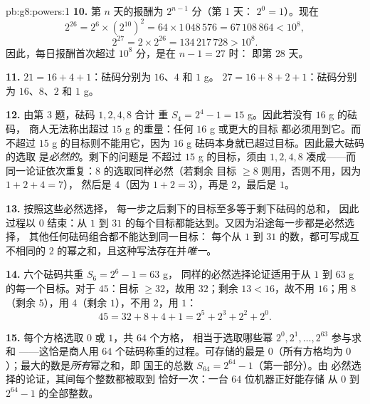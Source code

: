 \begin{solution}{pb:g8:powers:1}
\textbf{10.} 第 $n$ 天的报酬为 $2^{n-1}$ 分（第 1 天：
$2^0 = 1$）。现在
\[
2^{26} = 2^6 \times \left(2^{10}\right)^2
= 64 \times 1\,048\,576 = 67\,108\,864 < 10^8,
\]
\[
2^{27} = 2 \times 2^{26} = 134\,217\,728 > 10^8 .
\]
因此，每日报酬首次超过 $10^8$ 分，是在 $n - 1 = 27$ 时：
即第 $28$ 天。

\textbf{11.} $21 = 16 + 4 + 1$：砝码分别为 $16$、$4$ 和 $1$ g。
$27 = 16 + 8 + 2 + 1$：砝码分别为 $16$、$8$、$2$ 和 $1$ g。

\textbf{12.} 由第 3 题，砝码 $1, 2, 4, 8$ 合计
重 $S_4 = 2^4 - 1 = 15$ g。因此若没有 $16$ g 的砝码，
商人无法称出超过 $15$ g 的重量：任何 $16$ g 或更大的目标
都必须用到它。而不超过 $15$ g 的目标则不能用它，因为
$16$ g 砝码本身就已超过目标。因此最大砝码的选取
是\emph{必然的}。剩下的问题是
不超过 $15$ g 的目标，须由 $1, 2, 4, 8$ 凑成——而
同一论证依次重复：$8$ 的选取同样必然（若剩余
目标 $\geq 8$ 则用，否则不用，因为 $1 + 2 + 4 = 7$），
然后是 $4$（因为 $1 + 2 = 3$），再是 $2$，最后是 $1$。

\textbf{13.} 按照这些必然选择，
每一步之后剩下的目标至多等于剩下砝码的总和，
因此过程以 $0$ 结束：从 $1$ 到
$31$ 的每个目标都能达到。又因为沿途每一步都是必然选择，
其他任何砝码组合都不能达到同一目标：
每个从 $1$ 到 $31$ 的数，都可写成互不相同的
$2$ 的幂之和，且这种写法存在并\emph{唯一}。

\textbf{14.} 六个砝码共重 $S_6 = 2^6 - 1 = 63$ g，
同样的必然选择论证适用于从 $1$ 到
$63$ g 的每一个目标。对于 $45$：目标 $\geq 32$，故用 $32$；剩余
$13 < 16$，故不用 $16$；用 $8$（剩余 $5$），用 $4$（剩余
$1$），不用 $2$，用 $1$：
\[
45 = 32 + 8 + 4 + 1 = 2^5 + 2^3 + 2^2 + 2^0 .
\]

\textbf{15.} 每个方格选取 $0$ 或 $1$，共 $64$ 个方格，
相当于选取哪些幂 $2^0, 2^1, \dots, 2^{63}$ 参与求和
——这恰是商人用 $64$
个砝码称重的过程。可存储的最是 $0$（所有方格均为
$0$）；最大的数是\emph{所有}幂之和，即
国王的总数 $S_{64} = 2^{64} - 1$（第一部分）。由
必然选择的论证，其间每个整数都被取到
恰好一次：一台 $64$ 位机器正好能存储
从 $0$ 到 $2^{64} - 1$ 的全部整数。
\end{solution}
